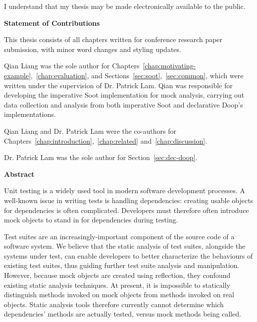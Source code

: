   \noindent
I understand that my thesis may be made electronically available to the public.

\cleardoublepage

\begin{center}\textbf{Statement of Contributions}\end{center}

This thesis consists of all chapters written for conference research paper submission, with minor word changes and styling updates.

Qian Liang was the sole author for Chapters~\ref{chap:motivating-example},~\ref{chap:evaluation}, and Sections~\ref{sec:soot},~\ref{sec:common}, which were written under the supervision of Dr. Patrick Lam. Qian was responsible for developing the imperative Soot implementation for mock analysis, carrying out data collection and analysis from both imperative Soot and declarative Doop's implementations.

Qian Liang and Dr. Patrick Lam were the co-authors for Chapters~\ref{chap:introduction},~\ref{chap:related} and~\ref{chap:discussion}. 

Dr. Patrick Lam was the sole author for Section~\ref{sec:dec-doop}.

\cleardoublepage


\begin{center}\textbf{Abstract}\end{center}

Unit testing is a widely used tool in modern software development processes. A well-known issue in writing tests is handling dependencies: creating usable objects for dependencies is often complicated. Developers must therefore often introduce mock objects to stand in for dependencies during testing. 

Test suites are an increasingly-important component of the source code of a software system. We believe that the static analysis of test suites, alongside the systems under test, can enable developers to better characterize the behaviours of existing test suites, thus guiding further test suite analysis and manipulation. However, because mock objects are created using reflection, they confound existing static analysis techniques. At present, it is impossible to statically distinguish methods invoked on mock objects from methods invoked on real objects. Static analysis tools therefore currently cannot determine which dependencies' methods are actually tested, versus mock methods being called.

